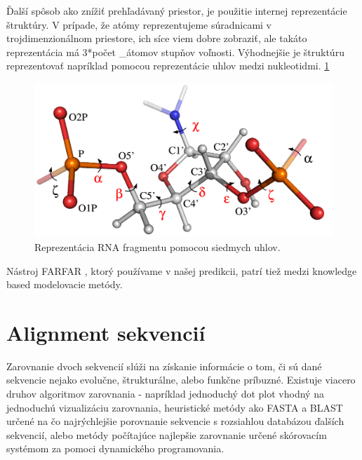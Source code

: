 \indent Ďalší spôsob ako znížiť prehľadávaný priestor, je použitie internej reprezentácie štruktúry. V prípade, že atómy reprezentujeme súradnicami v trojdimenzionálnom priestore, ich síce viem dobre zobraziť, ale takáto reprezentácia má 3*počet \_átomov stupňov voľnosti. Výhodnejšie je štruktúru reprezentovať napríklad pomocou reprezentácie uhlov medzi nukleotidmi.  \ref{obr02:reptesentation}


\begin{figure}%
\includegraphics[width=\textwidth]{../img/str_reprezentace_uhly}
\caption{Reprezentácia RNA fragmentu pomocou siedmych uhlov. \cite{Frellsen09} }
\label{obr02:reptesentation}
\end{figure}


\indent Nástroj FARFAR \cite{Das10}, ktorý používame v našej predikcii, patrí tiež medzi knowledge based modelovacie metódy.


\section{Alignment sekvencií}
Zarovnanie dvoch sekvencií slúži na získanie informácie o tom, či sú dané sekvencie nejako evolučne, štrukturálne, alebo funkčne príbuzné. Existuje viacero druhov algoritmov zarovnania - napríklad jednoduchý dot plot vhodný na jednoduchú vizualizáciu zarovnania, heuristické metódy ako FASTA a BLAST určené na čo najrýchlejšie porovnanie sekvencie s rozsiahlou databázou ďalších sekvencií, alebo metódy počítajúce najlepšie zarovnanie určené skórovacím systémom za pomoci dynamického programovania.


